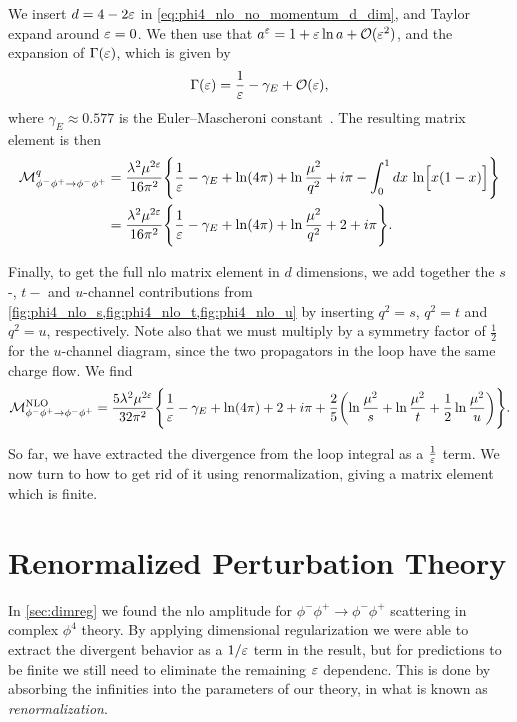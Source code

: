 We insert $d=4-2\varepsilon$ in \cref{eq:phi4_nlo_no_momentum_d_dim}, and Taylor expand around $\varepsilon=0$.
We then use that $a^\varepsilon = 1 + \varepsilon\ln a + \mathcal{O}(\varepsilon^2)$, and the expansion of $\Gamma(\varepsilon)$, which is given by~\cite{Schwartz:2014sze}
\begin{equation}\label{eq:Gamma_expansion}
    \Gamma(\varepsilon) = \frac{1}{\varepsilon} - \gamma_E + \mathcal{O}(\varepsilon),
\end{equation}
where $\gamma_E \approx \num{0.577}$ is the Euler--Mascheroni constant~\cite{Schwartz:2014sze}.
The resulting matrix element is then
\begin{equation}
\begin{split}\label{eq:phi4_nlo_eps_q}
    \mathcal{M}_{\phi^-\phi^+\to\phi^-\phi^+}^q &= \frac{\lambda^2\mu^{2\varepsilon}}{16\pi^2} \Biggl\{ \frac{1}{\varepsilon} - \gamma_E + \ln(4\pi) + \ln\frac{\mu^2}{q^2} + i\pi - \int_0^1 dx\, \ln\Bigl[x(1-x)\Bigr] \Biggr\}
    \\
    &= \frac{\lambda^2\mu^{2\varepsilon}}{16\pi^2} \Biggl\{ \frac{1}{\varepsilon} - \gamma_E + \ln(4\pi) + \ln\frac{\mu^2}{q^2} + 2 + i\pi \Biggr\}.
\end{split}
\end{equation}

Finally, to get the full \gls{nlo} matrix element in $d$ dimensions, we add together the $s$-, $t-$ and $u$-channel contributions from \cref{fig:phi4_nlo_s,fig:phi4_nlo_t,fig:phi4_nlo_u} by inserting $q^2=s$, $q^2=t$ and $q^2=u$, respectively.
Note also that we must multiply by a symmetry factor of $\frac{1}{2}$ for the $u$-channel diagram, since the two propagators in the loop have the same charge flow. We find
\begin{equation}\label{eq:phi4_nlo_eps}
    \mathcal{M}_{\phi^-\phi^+\to\phi^-\phi^+}^{\mathrm{NLO}} = \frac{5\lambda^2\mu^{2\varepsilon}}{32\pi^2} \Biggl\{
        \frac{1}{\varepsilon} - \gamma_E + \ln(4\pi) + 2 + i\pi + \frac{2}{5}\biggl(\ln\frac{\mu^2}{s} + \ln\frac{\mu^2}{t} + \frac{1}{2}\ln\frac{\mu^2}{u} \biggr)
    \Biggr\}.
\end{equation}

So far, we have extracted the divergence from the loop integral as a $\frac{1}{\varepsilon}$ term. We now turn to how to get rid of it using renormalization, giving a matrix element which is finite.



\section{Renormalized Perturbation Theory}\label{sec:renormalization}
In \cref{sec:dimreg} we found the \gls{nlo} amplitude for $\phi^-\phi^+\to\phi^-\phi^+$ scattering in complex $\phi^4$ theory.
By applying dimensional regularization we were able to extract the divergent behavior as a $1/\varepsilon$ term in the result, but for predictions to be finite we still need to eliminate the remaining $\varepsilon$ dependenc.
This is done by absorbing the infinities into the parameters of our theory, in what is known as \emph{renormalization}.

